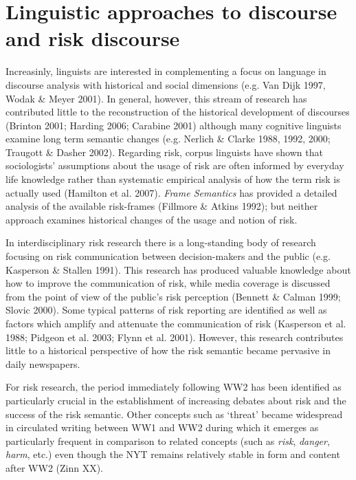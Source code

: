 \section{Linguistic approaches to discourse and risk discourse}

Increasinly, linguists are interested in complementing a focus on language in discourse analysis with historical and social dimensions (e.g. Van Dijk 1997, Wodak \& Meyer 2001). In general, however, this stream of research has contributed little to the reconstruction of the historical development of discourses (Brinton 2001; Harding 2006; Carabine 2001) although many cognitive linguists examine long term semantic changes (e.g. Nerlich \& Clarke 1988, 1992, 2000; Traugott \& Dasher 2002). Regarding risk, corpus linguists have shown that sociologists' assumptions about the usage of risk are often informed by everyday life knowledge rather than systematic empirical analysis of how the term risk is actually used (Hamilton et al. 2007). \emph{Frame Semantics} has provided a detailed analysis of the available risk-frames (Fillmore \& Atkins 1992); but neither approach examines historical changes of the usage and notion of risk.

In interdisciplinary risk research there is a long-standing body of research focusing on risk communication between decision-makers and the public (e.g. Kasperson \& Stallen 1991). This research has produced valuable knowledge about how to improve the communication of risk, while media coverage is discussed from the point of view of the public's risk perception (Bennett \& Calman 1999; Slovic 2000). Some typical patterns of risk reporting are identified as well as factors which amplify and attenuate the communication of risk (Kasperson et al. 1988; Pidgeon et al. 2003; Flynn et al. 2001). However, this research contributes little to a historical perspective of how the risk semantic became pervasive in daily newspapers. 


For risk research, the period immediately following WW2 has been identified as particularly crucial in the establishment of increasing debates about risk and the success of the risk semantic. Other concepts such as `threat' became widespread in circulated writing between WW1 and WW2 during which it emerges as particularly frequent in comparison to related concepts (such as \emph{risk}, \emph{danger}, \emph{harm}, etc.) even though the NYT remains relatively stable in form and content after WW2 (Zinn XX).

